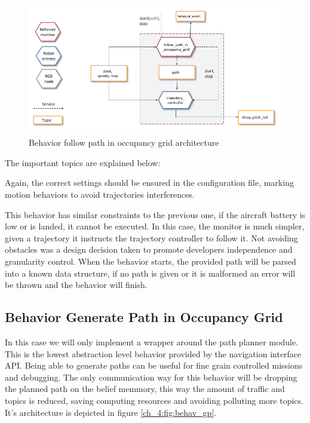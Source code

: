   \begin{figure}[h]
    \centering
    \includegraphics[width=\textwidth]{./Figures/BehaviorFPArquitecture.png}
    \caption{Behavior follow path in occupancy grid architecture}
    \label{ch_4:fig:behav_fp}
  \end{figure}

  The important topics are explained below:

  

  Again, the correct settings should be ensured in the configuration file, marking motion behaviors to avoid trajectories interferences.

  This behavior has similar constraints to the previous one, if the aircraft battery is low or is landed, it cannot be executed. In this case, the monitor is much simpler, given a trajectory it instructs the trajectory controller to follow it. Not avoiding obstacles was a design decision taken to promote developers independence and granularity control. When the behavior starts, the provided path will be parsed into a known data structure, if no path is given or it is malformed an error will be thrown and the behavior will finish.

\clearpage

\subsection{Behavior Generate Path in Occupancy Grid} \label{ch_4:subsect:behav_gpog}

  In this case we will only implement a wrapper around the path planner module. This is the lowest abstraction level behavior provided by the navigation interface API. Being able to generate paths can be useful for fine grain controlled missions and debugging. The only communication way for this behavior will be dropping the planned path on the belief memmory, this way the amount of traffic and topics is reduced, saving computing resources and avoiding polluting more topics. It's architecture is depicted in figure \ref{ch_4:fig:behav_gp}.

